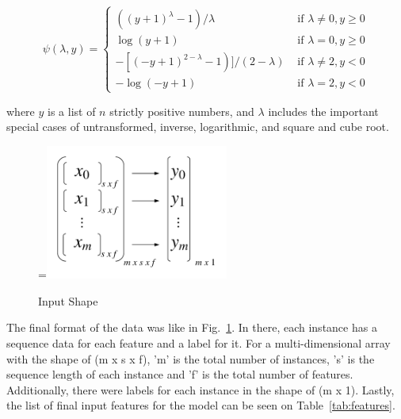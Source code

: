\documentclass[12pt,oneandhalf,chaparabic,lfm,phd,eng,oneside,pntc]{gsufbe}
\makeatletter
\let\old@includegraphics\includegraphics
\renewcommand{\includegraphics}[2][,]{%
  \setbox9=\hbox{\old@includegraphics[#1]{#2}}%
  \ifdim\wd9>\textwidth
    \old@includegraphics[#1,width=\textwidth]{#2}%
  \else
    \old@includegraphics[#1]{#2}%
  \fi%
}
\makeatother
\begin{document}
\begin{equation}
\psi(\lambda, y)=\left\{\begin{array}{ll}{\left((y+1)^{\lambda}-1\right) / \lambda} & {\text { if } \lambda \neq 0, y \geq 0} \\ {\log (y+1)} & {\text { if } \lambda=0, y \geq 0} \\ {-\left[(-y+1)^{2-\lambda}-1\right) ] /(2-\lambda)} & {\text { if } \lambda \neq 2, y<0} \\ {-\log (-y+1)} & {\text { if } \lambda=2, y<0}\end{array}\right.
\label{eq:Yeo-Johnson}
\end{equation}

where $ y $  is a list of $ n $ strictly positive numbers, and $\lambda$ includes the important special cases of untransformed, inverse, logarithmic, and square and cube root.

\begin{figure}[t]\vspace*{4pt}
\centerline{\includegraphics[width=60mm]{graphics/Input_Shape.png}}
\caption{Input Shape}
\label{fig:Input Shape}
\end{figure}

The final format of the data was like in Fig.~\ref{fig:Input Shape}. In there, each instance has a sequence data for each feature and a label for it. For a multi-dimensional array with the shape of (m x s x f), 'm' is the total number of instances, 's' is the sequence length of each instance and 'f' is the total number of features. Additionally, there were labels for each instance in the shape of (m x 1). Lastly, the list of final input features for the model can be seen on Table~\ref{tab:features}.
\end{document}
